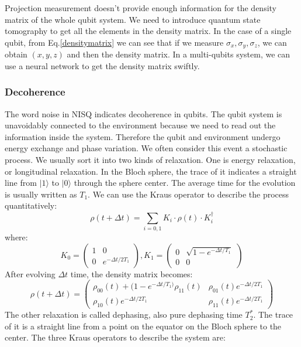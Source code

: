 Projection measurement doesn't provide enough information for the density matrix of the whole qubit system. We need to introduce quantum state tomography to get all the elements in the density matrix. In the case of a single qubit, from Eq.\ref{densitymatrix} we can see that if we measure $\sigma_x, \sigma_y, \sigma_z$, we can obtain $(x,y,z)$ and then the density matrix. In a multi-qubits system, we can use a neural network to get the density matrix swiftly\cite{RN55}.

\subsubsection{Decoherence}
The word noise in NISQ indicates decoherence in qubits. The qubit system is unavoidably connected to the environment because we need to read out the information inside the system. Therefore the qubit and environment undergo energy exchange and phase variation. We often consider this event a stochastic process.
We usually sort it into two kinds of relaxation. One is energy relaxation, or longitudinal relaxation\cite{RN8}. In the Bloch sphere, the trace of it indicates a straight line from $|1\rangle$ to $|0\rangle$ through the sphere center. The average time for the evolution is usually written as $T_1$. We can use the Kraus operator to describe the process quantitatively\cite{RN34}:
\begin{equation}
    \rho(t+\Delta t) = \sum_{i=0,1} K_i \cdot \rho (t) \cdot K_i^\dagger
\end{equation}
where:
\begin{equation}
    K_0 = \begin{pmatrix}
1 & 0 \\
0 & e^{-\Delta t/2T_1}
\end{pmatrix},
K_1 = \begin{pmatrix}
0 & \sqrt{1-e^{-\Delta t/T_1}} \\
0 & 0
\end{pmatrix}
\end{equation}
After evolving $\Delta t$ time, the density matrix becomes:
\begin{equation}
    \rho(t+\Delta t) = \begin{pmatrix}
\rho_{00}(t) + (1-e^{-\Delta t / T_1)}\rho_{11}(t) & \rho_{01}(t)e^{-\Delta t/2T_1} \\
\rho_{10}(t)e^{-\Delta t/2T_1} & \rho_{11}(t)e^{-\Delta t/2T_1}
\end{pmatrix}
\end{equation}
The other relaxation is called dephasing, also pure dephasing time $T_2^\ast$. The trace of it is a straight line from a point on the equator on the Bloch sphere to the center. The three Kraus operators to describe the system are:
